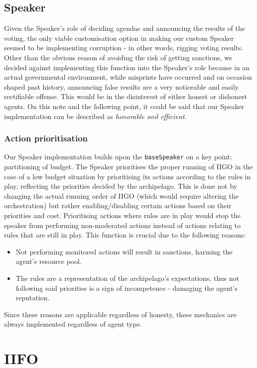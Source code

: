 \subsection{Speaker}
Given the Speaker's role of deciding agendas and announcing the results of the voting, the only viable customisation option in making our custom Speaker seemed to be implementing corruption - in other words, rigging voting results. Other than the obvious reason of avoiding the risk of getting sanctions, we decided against implementing this function into the Speaker's role because in an actual governmental environment, while misprints have occurred and on occasion shaped past history, announcing false results are a very noticeable and easily rectifiable offense. This would be in the disinterest of either honest or dishonest agents. On this note and the following point, it could be said that our Speaker implementation can be described as \emph{honorable and efficient}.

\subsubsection{Action prioritisation}

Our Speaker implementation builds upon the \texttt{baseSpeaker} on a key point: partitioning of budget. The Speaker prioritises the proper running of IIGO in the case of a low budget situation by prioritising its actions according to the rules in play, reflecting the priorities decided by the archipelago. This is done not by changing the actual running order of IIGO (which would require altering the orchestration) but rather enabling/disabling certain actions based on their priorities and cost. Prioritising actions where rules are in play would stop the speaker from performing non-moderated actions instead of actions relating to rules that are still in play. This function is crucial due to the following reasons:
\begin{itemize}
    \item Not performing monitored actions will result in sanctions, harming the agent's resource pool.
    \item The rules are a representation of the archipelago's expectations, thus not following said priorities is a sign of incompetence - damaging the agent's reputation.
\end{itemize}
Since these reasons are applicable regardless of honesty, these mechanics are always implemented regardless of agent type.

\section{IIFO}\label{sec:team4:IIFO}

